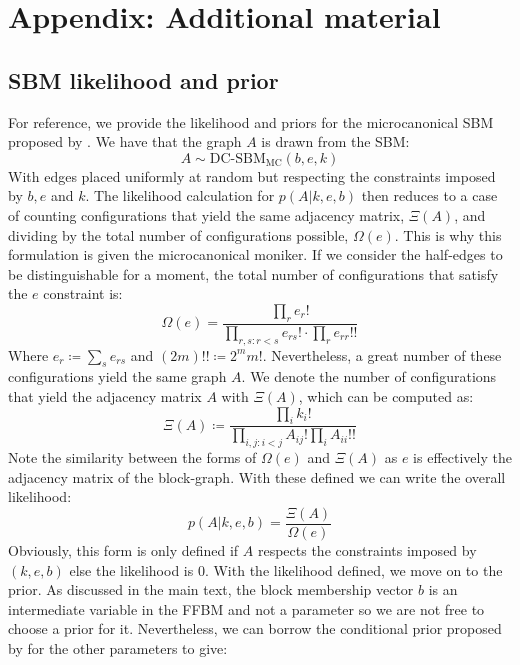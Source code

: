 \section{Appendix: Additional material}

\subsection{SBM likelihood and prior}
\label{appdx:sbm}

For reference, we provide the likelihood and priors for the microcanonical SBM proposed by \citet{Peixoto-Bayesian-Microcanonical}. We have that the graph $A$ is drawn from the SBM:
%
\begin{equation}
	A \sim \textrm{DC-SBM}_{\textrm{MC}}(b, e, k)
\end{equation}
%
With edges placed uniformly at random but respecting the constraints imposed by $b, e$ and $k$. The likelihood calculation for $p(A|k, e, b)$ then reduces to a case of counting configurations that yield the same adjacency matrix, $\Xi (A)$, and dividing by the total number of configurations possible, $\Omega(e)$. This is why this formulation is given the microcanonical moniker. If we consider the half-edges to be distinguishable for a moment, the total number of configurations that satisfy the $e$ constraint is:
%
\begin{equation}
	\Omega(e) = \frac{\prod_{r} e_r !}{\prod_{r,s : r < s} e_{rs}! \cdot \prod_{r} e_{rr}!!}
\end{equation}
%
Where $e_r \coloneqq \sum_{s} e_{rs}$ and $(2m)!! \coloneqq 2^m m!$. Nevertheless, a great number of these configurations yield the same graph $A$. We denote the number of configurations that yield the adjacency matrix $A$ with $\Xi(A)$, which can be computed as:
%
\begin{equation}
	\Xi(A) \coloneqq \frac{\prod_i k_i !}{\prod_{i,j : i < j} A_{ij} ! \prod_i A_{ii} !! }
\end{equation}
%
Note the similarity between the forms of $\Omega(e)$ and $\Xi(A)$ as $e$ is effectively the adjacency matrix of the block-graph. With these defined we can write the overall likelihood:
%
\begin{equation}
	p(A|k,e,b) = \frac{\Xi(A)}{\Omega(e)}
\end{equation}
%
Obviously, this form is only defined if $A$ respects the constraints imposed by $(k,e,b)$ else the likelihood is 0. With the likelihood defined, we move on to the prior. As discussed in the main text, the block membership vector $b$ is an intermediate variable in the FFBM and not a parameter so we are not free to choose a prior for it. Nevertheless, we can borrow the conditional prior proposed by \citet{Peixoto-Bayesian-Microcanonical} for the other parameters to give:

